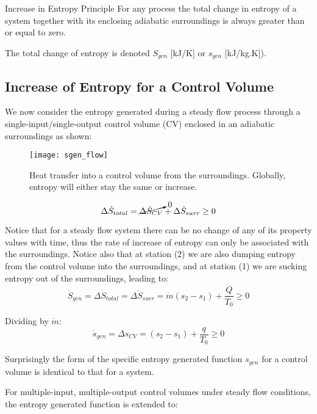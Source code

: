 \begin{quoteWithTitle}{Increase in Entropy Principle}
  For any process the total change in entropy of a system together with its enclosing adiabatic surroundings is always greater than or equal to zero.
\end{quoteWithTitle}

The total change of entropy is denoted $S_{gen}$ [kJ/K] or $s_{gen}$ [kJ/kg.K]).

\subsection{Increase of Entropy for a Control Volume}
We now consider the entropy generated during a steady flow process through a single-input/single-output control volume (CV) enclosed in an adiabatic surroundings as shown:%
\nopagebreak[4]%
\begin{figure}[H]
  \centering
  \texttt{[image: sgen\_flow]}
  \caption{Heat transfer into a control volume from the surroundings.  Globally, entropy will either stay the same or increase.}
  \label{fig:sgen_flow}
\end{figure}

\begin{equation*}
  \Delta\dot{S}_{total} = \cancelto{0}{\Delta\dot{S}_{CV}} + \Delta\dot{S}_{surr} \ge 0
\end{equation*}

Notice that for a steady flow system there can be no change of any of its property values with time, thus the rate of increase of entropy can only be associated with the surroundings. Notice also that at station (2) we are also dumping entropy from the control volume into the surroundings, and at station (1) we are sucking entropy out of the surroundings, leading to:
\begin{equation*}
  \dot{S}_{gen} = \Delta\dot{S}_{total} = \Delta\dot{S}_{surr} = \dot{m}(s_2-s_1) + \frac{\dot{Q}}{T_0} \ge 0
\end{equation*}

Dividing by $\dot{m}$:
\begin{equation*}
  \dot{s}_{gen} = \Delta{s}_{CV} = (s_2-s_1) + \frac{q}{T_0} \ge 0
\end{equation*}

Surprisingly the form of the specific entropy generated function $s_{gen}$ for a control volume is identical to that for a system.

For multiple-input, multiple-output control volumes under steady flow conditions, the entropy generated function is extended to:

